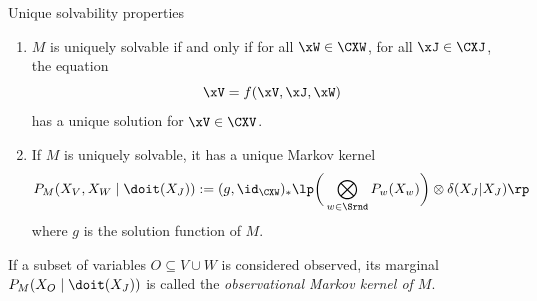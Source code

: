 \begin{frame}{Unique solvability properties}
\begin{theorem}
  \begin{enumerate}
    \item $M$ is uniquely solvable if and only if 
      for all $\xW\in\CXW$, for all $\xJ \in \CXJ$, the equation
      $$\xV = f(\xV,\xJ,\xW)$$
      has a unique solution for $\xV\in\CXV$.
    \item If $M$ is uniquely solvable, it has a unique Markov kernel
      $$P_{M}(X_V,X_W \mid \doit(X_J)) := (g,\id_{\CXW})_* \lp \bigg( \bigotimes_{w\in\Srnd} P_w(X_w) \bigg) \otimes \delta(X_J|X_J) \rp$$
      where $g$ is the solution function of $M$.
  \end{enumerate}
\end{theorem}
\begin{definition}
  If a subset of variables $O \subseteq V \cup W$ is considered observed, its marginal
  $P_{M}(X_O \mid \doit(X_J))$ is called the \emph{observational Markov kernel of $M$}.
\end{definition}
\end{frame}

%

